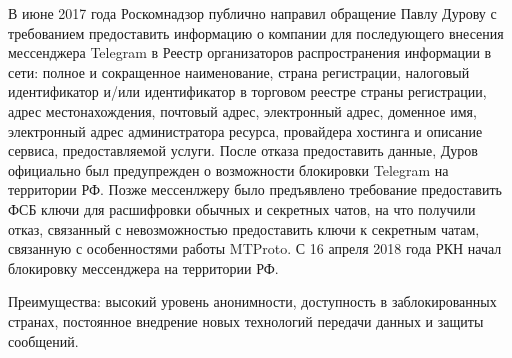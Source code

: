 В июне 2017 года Роскомнадзор  публично направил обращение Павлу Дурову с требованием предоставить информацию о компании для последующего внесения мессенджера Telegram в Реестр организаторов распространения информации в сети: полное и сокращенное наименование, страна регистрации, налоговый идентификатор и/или идентификатор в торговом реестре страны регистрации, адрес местонахождения, почтовый адрес, электронный адрес, доменное имя, электронный адрес администратора ресурса, провайдера хостинга и описание сервиса, предоставляемой услуги. %
После отказа предоставить данные, Дуров официально был предупрежден о возможности блокировки Telegram на территории РФ. %
Позже мессенлжеру было предъявлено требование предоставить ФСБ ключи для расшифровки обычных и секретных чатов, на что получили отказ, связанный с невозможностью предоставить ключи к секретным чатам, связанную с особенностями работы MTProto. С 16 апреля 2018 года РКН начал блокировку мессенджера на территории РФ.

Преимущества: высокий уровень анонимности, доступность в заблокированных странах, постоянное внедрение новых технологий передачи данных и защиты сообщений.

